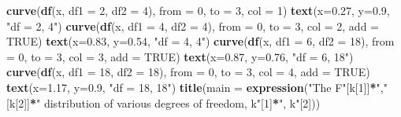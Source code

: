 \documentclass[
]{article}
\newenvironment{Shaded}{\begin{snugshade}}{\end{snugshade}}
\newcommand{\AttributeTok}[1]{\textcolor[rgb]{0.13,0.29,0.53}{#1}}
\newcommand{\ConstantTok}[1]{\textcolor[rgb]{0.56,0.35,0.01}{#1}}
\newcommand{\DecValTok}[1]{\textcolor[rgb]{0.00,0.00,0.81}{#1}}
\newcommand{\FloatTok}[1]{\textcolor[rgb]{0.00,0.00,0.81}{#1}}
\newcommand{\FunctionTok}[1]{\textcolor[rgb]{0.13,0.29,0.53}{\textbf{#1}}}
\newcommand{\NormalTok}[1]{#1}
\newcommand{\SpecialCharTok}[1]{\textcolor[rgb]{0.81,0.36,0.00}{\textbf{#1}}}
\newcommand{\StringTok}[1]{\textcolor[rgb]{0.31,0.60,0.02}{#1}}
\begin{document}
\begin{Shaded}
\begin{Highlighting}[]
\FunctionTok{curve}\NormalTok{(}\FunctionTok{df}\NormalTok{(x, }\AttributeTok{df1 =} \DecValTok{2}\NormalTok{, }\AttributeTok{df2 =} \DecValTok{4}\NormalTok{), }\AttributeTok{from =} \DecValTok{0}\NormalTok{, }\AttributeTok{to =} \DecValTok{3}\NormalTok{, }\AttributeTok{col =} \DecValTok{1}\NormalTok{)}
\FunctionTok{text}\NormalTok{(}\AttributeTok{x=}\FloatTok{0.27}\NormalTok{, }\AttributeTok{y=}\FloatTok{0.9}\NormalTok{, }\StringTok{"df = 2, 4"}\NormalTok{)}
\FunctionTok{curve}\NormalTok{(}\FunctionTok{df}\NormalTok{(x, }\AttributeTok{df1 =} \DecValTok{4}\NormalTok{, }\AttributeTok{df2 =} \DecValTok{4}\NormalTok{), }\AttributeTok{from =} \DecValTok{0}\NormalTok{, }\AttributeTok{to =} \DecValTok{3}\NormalTok{, }\AttributeTok{col =} \DecValTok{2}\NormalTok{, }\AttributeTok{add =} \ConstantTok{TRUE}\NormalTok{)}
\FunctionTok{text}\NormalTok{(}\AttributeTok{x=}\FloatTok{0.83}\NormalTok{, }\AttributeTok{y=}\FloatTok{0.54}\NormalTok{, }\StringTok{"df = 4, 4"}\NormalTok{)}
\FunctionTok{curve}\NormalTok{(}\FunctionTok{df}\NormalTok{(x, }\AttributeTok{df1 =} \DecValTok{6}\NormalTok{, }\AttributeTok{df2 =} \DecValTok{18}\NormalTok{), }\AttributeTok{from =} \DecValTok{0}\NormalTok{, }\AttributeTok{to =} \DecValTok{3}\NormalTok{, }\AttributeTok{col =} \DecValTok{3}\NormalTok{, }\AttributeTok{add =} \ConstantTok{TRUE}\NormalTok{)}
\FunctionTok{text}\NormalTok{(}\AttributeTok{x=}\FloatTok{0.87}\NormalTok{, }\AttributeTok{y=}\FloatTok{0.76}\NormalTok{, }\StringTok{"df = 6, 18"}\NormalTok{)}
\FunctionTok{curve}\NormalTok{(}\FunctionTok{df}\NormalTok{(x, }\AttributeTok{df1 =} \DecValTok{18}\NormalTok{, }\AttributeTok{df2 =} \DecValTok{18}\NormalTok{), }\AttributeTok{from =} \DecValTok{0}\NormalTok{, }\AttributeTok{to =} \DecValTok{3}\NormalTok{, }\AttributeTok{col =} \DecValTok{4}\NormalTok{, }\AttributeTok{add =} \ConstantTok{TRUE}\NormalTok{)}
\FunctionTok{text}\NormalTok{(}\AttributeTok{x=}\FloatTok{1.17}\NormalTok{, }\AttributeTok{y=}\FloatTok{0.9}\NormalTok{, }\StringTok{"df = 18, 18"}\NormalTok{)}
\FunctionTok{title}\NormalTok{(}\AttributeTok{main =} \FunctionTok{expression}\NormalTok{(}\StringTok{"The F"}\NormalTok{[k[}\DecValTok{1}\NormalTok{]]}\SpecialCharTok{*}\StringTok{","}\NormalTok{[k[}\DecValTok{2}\NormalTok{]]}\SpecialCharTok{*}\StringTok{" distribution of various degrees of freedom, k"}\NormalTok{[}\DecValTok{1}\NormalTok{]}\SpecialCharTok{*}\StringTok{", k"}\NormalTok{[}\DecValTok{2}\NormalTok{]))}
\end{Highlighting}
\end{Shaded}
\end{document}
